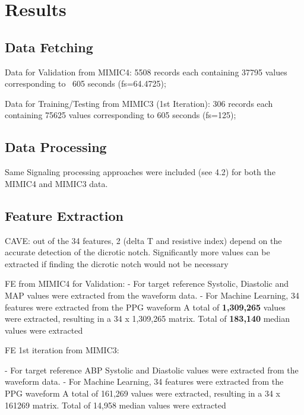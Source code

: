 \documentclass[12pt, bibliography=totoc]{scrartcl}
\begin{document}
    \section{Results}
    \label{sec:results}

    \subsection{Data Fetching}
    \label{subsec:data_fetching}

    Data for Validation from MIMIC4:
    5508 records each containing 37795 values corresponding to ~605 seconds (fs=64.4725);

    Data for Training/Testing from MIMIC3 (1st Iteration):
    306 records each containing 75625 values corresponding to 605 seconds (fs=125);

    \subsection{Data Processing}
    \label{subsec:data_processing}

    Same Signaling processing approaches were included (see 4.2) for both the MIMIC4 and MIMIC3 data.

    \subsection{Feature Extraction}
    \label{subsec:feature_extraction}

    CAVE: out of the 34 features, 2 (delta T and resistive index) depend on the accurate detection of the dicrotic notch.
    Significantly more values can be extracted if finding the dicrotic notch would not be necessary

    FE from MIMIC4 for Validation:
    - For target reference Systolic, Diastolic and MAP values were extracted from the waveform data.
    - For Machine Learning, 34 features were extracted from the PPG waveform
    A total of \textbf{1,309,265} values were extracted, resulting in a 34 x 1,309,265 matrix.
    Total of \textbf{183,140} median values were extracted

    FE 1st iteration from MIMIC3:

    - For target reference ABP Systolic and Diastolic values were extracted from the waveform data.
    - For Machine Learning, 34 features were extracted from the PPG waveform
    A total of 161,269 values were extracted, resulting in a 34 x 161269 matrix.
    Total of 14,958 median values were extracted
\end{document}
